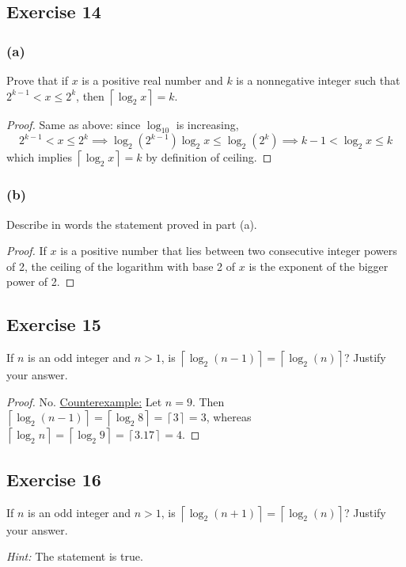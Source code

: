 \documentclass[14pt]{extarticle}
\newcommand{\ceil}[1]{{\left\lceil#1\right\rceil}}
\begin{document}
\subsection{Exercise 14}
\subsubsection{(a)}
Prove that if \(x\) is a positive real number and \(k\) is a nonnegative integer such that \(2^{k-1} < x \leq 2^k\), then
\(\ceil{\log_2 x} = k\).

\begin{proof}
    Same as above: since \(\log_{10}\) is increasing,
    \[
        2^{k-1} < x \leq 2^k \implies \log_{2}(2^{k-1}) \log_2 x \leq  \log_2(2^k) \implies k-1 < \log_2 x \leq k
    \]
    which implies \(\ceil{\log_2 x} = k\) by definition of ceiling.
\end{proof}

\subsubsection{(b)}
Describe in words the statement proved in part (a).

\begin{proof}
    If \(x\) is a positive number that lies between two consecutive integer powers of 2, the ceiling of the logarithm with base 2 of \(x\) is the exponent of the bigger power of 2.
\end{proof}

\subsection{Exercise 15}
If \(n\) is an odd integer and \(n > 1\), is \(\ceil{\log_2(n - 1)} = \ceil{\log_2(n)}\)? Justify your answer.

\begin{proof}
    No. \underline{Counterexample:} Let \(n = 9\). Then \(\ceil{\log_2 (n - 1)} =  \ceil{\log_2 8} = \ceil{3} = 3\),
    whereas \(\ceil{\log_2 n} = \ceil{\log_2 9} = \ceil{3.17} = 4\).
\end{proof}

\subsection{Exercise 16}
If \(n\) is an odd integer and \(n > 1\), is \(\ceil{\log_2(n + 1)} = \ceil{\log_2(n)}\)? Justify your answer.

    {\it Hint:} The statement is true.
\end{document}

